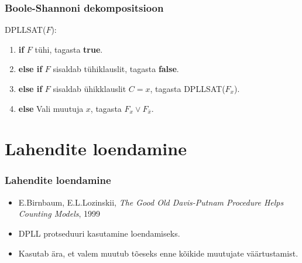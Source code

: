 \documentclass{beamer}
\begin{document}
\frame
{
	\frametitle{Boole-Shannoni dekompositsioon}
	
	DPLLSAT($F$):
	\begin{enumerate}
		\item \textbf{if} $F$ tühi, tagasta \textbf{true}.
		\item \textbf{else if} $F$ sisaldab tühiklauslit, tagasta \textbf{false}.
		\item \textbf{else if} $F$ sisaldab ühikklauslit $C=x$, tagasta DPLLSAT($F_x$).
		\item \textbf{else} Vali muutuja $x$, tagasta $F_x\vee F_{\bar{x}}$.
	\end{enumerate}
}
\section{Lahendite loendamine}
\frame
{
	\frametitle{Lahendite loendamine}
	
	\begin{itemize}
		\item E.Birnbaum, E.L.Lozinskii, \emph{The Good Old Davis-Putnam Procedure Helps Counting Models}, 1999
		\item DPLL protseduuri kasutamine loendamiseks.
		\item Kasutab ära, et valem muutub tõeseks enne kõikide muutujate väärtustamist.
		
	\end{itemize}
}
\end{document}
